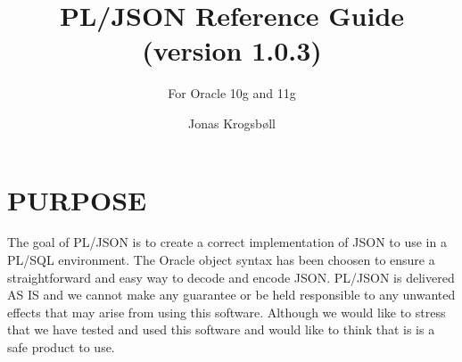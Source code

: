 \documentclass[11pt,a4paper]{article}
\title{PL/JSON Reference Guide (version 1.0.3)}
\subtitle{For Oracle 10g and 11g}
\author{Jonas Krogsbøll}
\date{}
\begin{document}
\maketitle
\vspace{2in}
\tableofcontents
\newpage

\section{PURPOSE}
The goal of PL/JSON is to create a correct implementation of JSON to use in a PL/SQL environment. The Oracle object syntax has been choosen to ensure a straightforward and easy way to decode and encode JSON. PL/JSON is delivered AS IS and we cannot make any guarantee or be held responsible to any unwanted effects that may arise from using this software. Although we would like to stress that we have tested and used this software and would like to think that is is a safe product to use.
\end{document}
